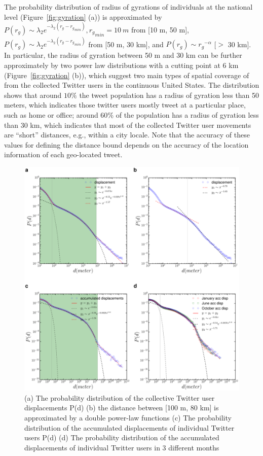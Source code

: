 \documentclass[ijgi,article,accept,moreauthors,pdftex,10pt,a4paper]{mdpi}
\theoremstyle{mdpi}
\newcounter{re}
\theoremstyle{mdpidefinition}
\begin{document}
The probability distribution of radius of gyrations of individuals at the national level (Figure~\ref{fig:gyration} (a)) is approximated by $P(r_{g}) \sim \lambda_{2} e^{-\lambda_{2}(r_{g} - {r_{g}}_{min})}, {r_{g}}_{min}=10~m$ from [10 m, 50 m], $P(r_{g}) \sim \lambda_{2} e^{-\lambda_{2}(r_{g} - {r_{g}}_{min})}$ from [50 m, 30 km], and $P(r_{g}) \sim {r_{g}}^{-\alpha}$ [$>$ 30 km].
In particular, the radius of gyration between 50 m and 30 km can be further approximately by two power law distributions with a cutting point at 6 km (Figure~\ref{fig:gyration} (b)), which suggest two main types of spatial coverage of from the collected Twitter users in the continuous United States.
The distribution shows that around $10\%$ the tweet population has a radius of gyration less than 50 meters, which indicates those twitter users mostly tweet at a particular place, such as home or office;  around 60$\%$ of the population has a radius of gyration less than 30 km, which indicates that most of the collected Twitter user movements are ``short'' distances, e.g., within a city locale. Note that the accuracy of these values for defining the distance bound depends on the accuracy of the location information of each geo-located tweet.

\begin{figure}[ht]
\centering
\includegraphics[width=1.0\linewidth]{./figures/displacement}
\caption{(a) The probability distribution of the collective Twitter user displacements P(d) (b) the distance between [100 m, 80 km] is approximated by a double power-law functions (c) The probability distribution of the accumulated displacements of individual Twitter users P(d) (d) The probability distribution of the accumulated displacements of individual Twitter users in 3 different months}
\label{fig:displacement}
\end{figure}
\FloatBarrier
\end{document}
